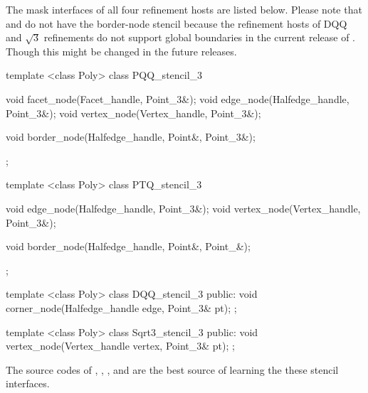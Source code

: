 The mask interfaces of all four refinement hosts are listed below.
Please note that  and  
do not have the border-node stencil because the refinement hosts of
DQQ and $\sqrt{3}$ refinements do not support global boundaries in the 
current release of . Though this might be 
changed in the future releases.



\begin{ccExampleCode}
template <class Poly>
class PQQ_stencil_3 {
  void facet_node(Facet_handle, Point_3&);
  void edge_node(Halfedge_handle, Point_3&);
  void vertex_node(Vertex_handle, Point_3&);

  void border_node(Halfedge_handle, Point&, Point_3&);
};

template <class Poly>
class PTQ_stencil_3 {
  void edge_node(Halfedge_handle, Point_3&);
  void vertex_node(Vertex_handle, Point_3&);

  void border_node(Halfedge_handle, Point&, Point_&);
};

template <class Poly>
class DQQ_stencil_3 {
public:
  void corner_node(Halfedge_handle edge, Point_3& pt);
};

template <class Poly>
class Sqrt3_stencil_3 {
public:
  void vertex_node(Vertex_handle vertex, Point_3& pt);
};
\end{ccExampleCode}

The source codes of , ,
, and  are
the best source of learning the these stencil 
interfaces. 





